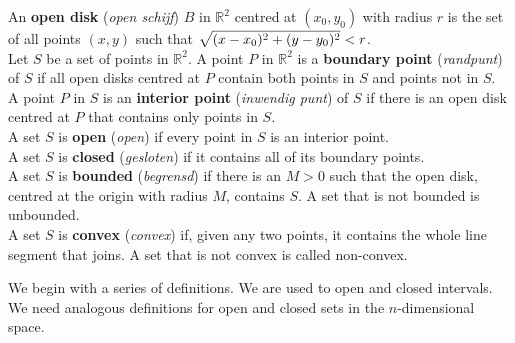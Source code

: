 \begin{definition}\label{def:open}
An \textbf{open disk} (\textit{open schijf}) $B$ in $\mathbb{R}^2$ centred at $(x_0,y_0)$ with radius $r$ is the set of all points $(x,y)$ such that $\displaystyle\sqrt{(x-x_0)^2+(y-y_0)^2} < r$. \\

Let $S$ be a set of points in $\mathbb{R}^2$. A point $P$ in $\mathbb{R}^2$ is a \textbf{boundary point} (\textit{randpunt}) of $S$  if all open disks centred at $P$ contain both points in $S$ and points not in $S$.\\

A point $P$ in $S$ is an \textbf{interior point} (\textit{inwendig punt}) of $S$ if there is an open disk centred at $P$ that contains only points in $S$. \\

A set $S$ is \textbf{open} (\textit{open}) if every point in $S$ is an interior point.\\

A set $S$ is \textbf{closed} (\textit{gesloten}) if it contains all of its boundary points.\\

A set $S$ is \textbf{bounded} (\textit{begrensd}) if there is an $M>0$ such that the open disk, centred at the origin with radius $M$, contains $S$. A set that is not bounded is unbounded.\\

A set $S$ is \textbf{convex} (\textit{convex}) if, given any two points, it contains the whole line segment that joins. A set that is not convex is called non-convex.


\end{definition}
\fi


\ifanalysis
We begin with a series of definitions. We are used to open  and closed intervals. We need analogous definitions for open and closed sets in the $n$-dimensional space.

